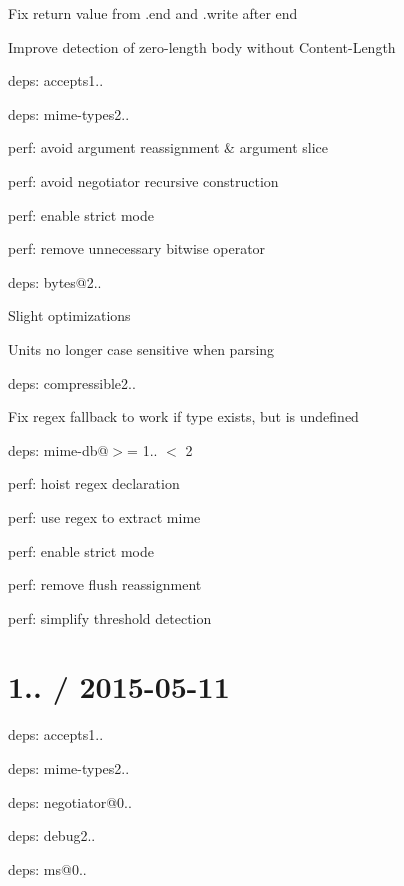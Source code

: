 \begin{DoxyItemize}
\item Fix return value from {\ttfamily .end} and {\ttfamily .write} after end
\item Improve detection of zero-\/length body without {\ttfamily Content-\/\+Length}
\item deps\+: accepts1..
\begin{DoxyItemize}
\item deps\+: mime-\/types2..
\item perf\+: avoid argument reassignment \& argument slice
\item perf\+: avoid negotiator recursive construction
\item perf\+: enable strict mode
\item perf\+: remove unnecessary bitwise operator
\end{DoxyItemize}
\item deps\+: bytes@2..
\begin{DoxyItemize}
\item Slight optimizations
\item Units no longer case sensitive when parsing
\end{DoxyItemize}
\item deps\+: compressible2..
\begin{DoxyItemize}
\item Fix regex fallback to work if type exists, but is undefined
\item deps\+: mime-\/db@\textquotesingle{}$>$= 1.. $<$ 2\textquotesingle{}
\item perf\+: hoist regex declaration
\item perf\+: use regex to extract mime
\end{DoxyItemize}
\item perf\+: enable strict mode
\item perf\+: remove flush reassignment
\item perf\+: simplify threshold detection
\end{DoxyItemize}

\section*{1.. / 2015-\/05-\/11 }


\begin{DoxyItemize}
\item deps\+: accepts1..
\begin{DoxyItemize}
\item deps\+: mime-\/types2..
\item deps\+: negotiator@0..
\end{DoxyItemize}
\item deps\+: debug2..
\begin{DoxyItemize}
\item deps\+: ms@0..
\end{DoxyItemize}
\end{DoxyItemize}

